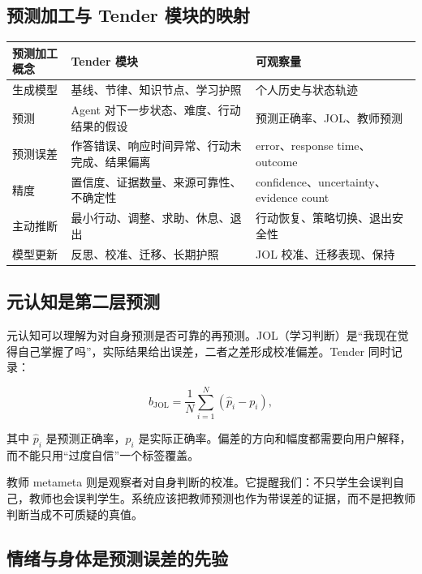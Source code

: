 \documentclass[UTF8,a4paper,11pt]{ctexart}
\begin{document}
\subsection{预测加工与 Tender 模块的映射}

\begin{center}
\begin{longtable}{@{}p{3.2cm}p{4.6cm}p{6.2cm}@{}}
\toprule
\textbf{预测加工概念} & \textbf{Tender 模块} & \textbf{可观察量} \\
\midrule
生成模型 & 基线、节律、知识节点、学习护照 & 个人历史与状态轨迹 \\
预测 & Agent 对下一步状态、难度、行动结果的假设 & 预测正确率、JOL、教师预测 \\
预测误差 & 作答错误、响应时间异常、行动未完成、结果偏离 & error、response time、outcome \\
精度 & 置信度、证据数量、来源可靠性、不确定性 & confidence、uncertainty、evidence count \\
主动推断 & 最小行动、调整、求助、休息、退出 & 行动恢复、策略切换、退出安全性 \\
模型更新 & 反思、校准、迁移、长期护照 & JOL 校准、迁移表现、保持 \\
\bottomrule
\end{longtable}
\end{center}

\subsection{元认知是第二层预测}

元认知可以理解为对自身预测是否可靠的再预测。JOL（学习判断）是“我现在觉得自己掌握了吗”，实际结果给出误差，二者之差形成校准偏差。Tender 同时记录：

\begin{equation}
b_{\mathrm{JOL}}=\frac{1}{N}\sum_{i=1}^{N}(\hat p_i-p_i),
\end{equation}

其中 \(\hat p_i\) 是预测正确率，\(p_i\) 是实际正确率。偏差的方向和幅度都需要向用户解释，而不能只用“过度自信”一个标签覆盖。

教师 metameta 则是观察者对自身判断的校准。它提醒我们：不只学生会误判自己，教师也会误判学生。系统应该把教师预测也作为带误差的证据，而不是把教师判断当成不可质疑的真值。

\subsection{情绪与身体是预测误差的先验}
\end{document}
